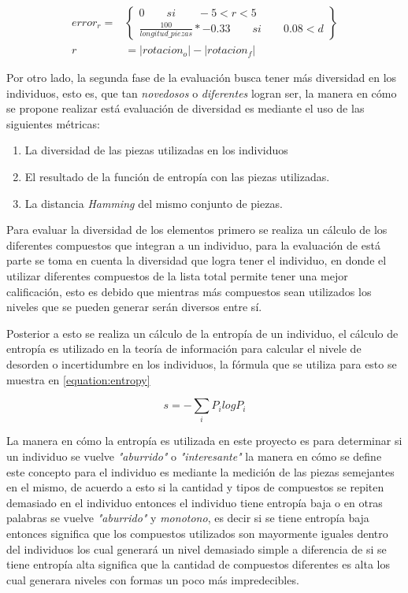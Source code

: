 \begin{equation}
    \begin{split}
      error_{r} = & 
      \begin{Bmatrix}
        0 \qquad si \qquad -5 < r < 5 \\ 
        \frac{100}{longitud\_piezas} * -0.33 \qquad si \qquad 0.08 < d
      \end{Bmatrix} \\
       r & = \left | rotacion_o \right | - \left | rotacion_f \right |
    \end{split}
    \label{equation:error_ang}
\end{equation}

Por otro lado, la segunda fase de la evaluación busca tener más diversidad en los
individuos, esto es, que tan \textit{novedosos} o \textit{diferentes} logran ser, la
manera en cómo se propone realizar está evaluación de diversidad es mediante el
uso de las siguientes métricas:
\begin{enumerate}
    \item La diversidad de las piezas utilizadas en los individuos
    \item El resultado de la función de entropía con las piezas utilizadas.
    \item La distancia \textit{Hamming} del mismo conjunto de piezas.
\end{enumerate}

Para evaluar la diversidad de los elementos primero se realiza un cálculo de los
diferentes compuestos que integran a un individuo, para la evaluación de está
parte se toma en cuenta la diversidad que logra tener el individuo, en donde el
utilizar diferentes compuestos de la lista total permite tener una mejor
calificación, esto es debido que mientras más compuestos sean utilizados los
niveles que se pueden generar serán diversos entre sí.

Posterior a esto se realiza un cálculo de la entropía de un individuo, el
cálculo de entropía es utilizado en la teoría de información para calcular el
nivele de desorden o incertidumbre en los individuos, la fórmula que se utiliza
para esto se muestra en \ref{equation:entropy}

\begin{equation}
  s = -\sum _{i} P_i log P_i
  \label{equation:entropy}
\end{equation}

La manera en cómo la entropía es utilizada en este proyecto es para determinar
si un individuo se vuelve \textit{"aburrido"} o \textit{"interesante"} la manera
en cómo se define este concepto para el individuo es mediante la medición de las
piezas semejantes en el mismo, de acuerdo a esto si la cantidad y tipos de
compuestos se repiten demasiado en el individuo entonces el individuo tiene
entropía baja o en otras palabras se vuelve \textit{"aburrido"} y
\textit{monotono}, es decir si se tiene entropía baja entonces significa que los
compuestos utilizados son mayormente iguales dentro del individuos los cual
generará un nivel demasiado simple a diferencia de si se tiene entropía alta
significa que la cantidad de compuestos diferentes es alta los cual generara
niveles con formas un poco más impredecibles.

